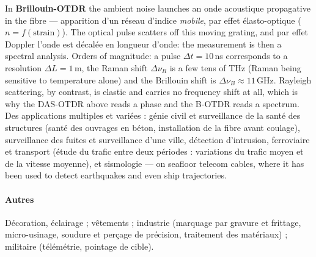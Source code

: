 In \textbf{Brillouin-OTDR} the ambient noise launches an onde acoustique
propagative in the fibre --- apparition d'un réseau d'indice \emph{mobile}, par effet
élasto-optique ($n = f(\text{strain})$). The optical pulse scatters off this
moving grating, and par effet Doppler l'onde est décalée en longueur d'onde:
the measurement is then a spectral analysis. Orders of magnitude: a
pulse $\Delta t = 10$\,ns corresponds to a resolution $\Delta L = 1$\,m, the Raman
shift $\Delta\nu_R$ is a few tens of THz (Raman being sensitive to temperature
alone) and the Brillouin shift is $\Delta\nu_B \approx 11$\,GHz. Rayleigh
scattering, by contrast, is elastic and carries no frequency shift at all,
which is why the DAS-OTDR above reads a phase and the B-OTDR reads a spectrum.\\

Des applications multiples et variées : génie civil et surveillance de la
santé des structures (santé des ouvrages en béton, installation de la fibre
avant coulage), surveillance des fuites et surveillance d'une ville, détection
d'intrusion, ferroviaire et transport (étude du trafic entre deux périodes :
variations du trafic moyen et de la vitesse moyenne), et sismologie --- on
seafloor telecom cables, where it has been used to detect earthquakes and even
ship trajectories.

\paragraph{Autres} Décoration, éclairage ; vêtements ; industrie (marquage par
gravure et frittage, micro-usinage, soudure et perçage de précision, traitement
des matériaux) ; militaire (télémétrie, pointage de cible).
